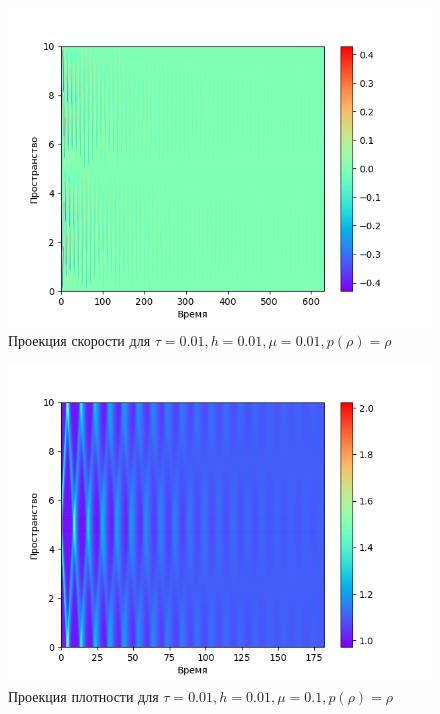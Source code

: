 \documentclass[12pt,a4paper]{article}
\begin{document}
\begin{center}
\begin{figure}[H]
    \centering
    \includegraphics[height=0.4\textheight]{pics/task2/u-2-2-21_1.png}
    \caption{Проекция скорости для $\tau = 0.01, h = 0.01, \mu = 0.01, p(\rho) = \rho$}
\end{figure}

\begin{figure}[H]
    \centering
    \includegraphics[height=0.4\textheight]{pics/task2/h-2-2-11_1.png}
    \caption{Проекция плотности для $\tau = 0.01, h = 0.01, \mu = 0.1, p(\rho) = \rho$}
\end{figure}


\end{center}
\end{document}

